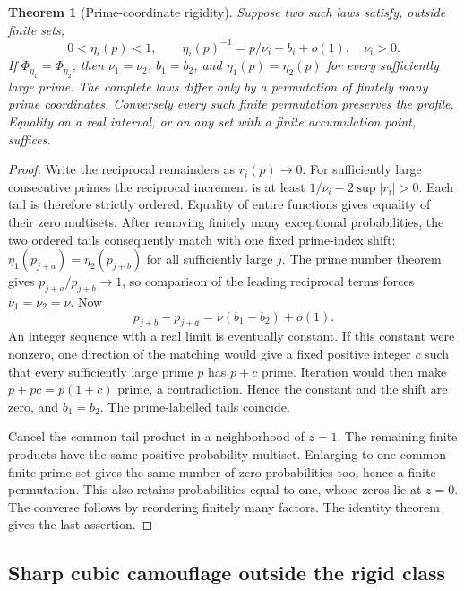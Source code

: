 \documentclass[11pt]{article}
\newtheorem{theorem}{Theorem}[section]
\theoremstyle{definition}
\begin{document}
\begin{theorem}[Prime-coordinate rigidity]
Suppose two such laws satisfy, outside finite sets,
\[
 0<\eta_i(p)<1,\qquad
 \eta_i(p)^{-1}=p/\nu_i+b_i+o(1),\quad \nu_i>0.
\]
If $\Phi_{\eta_1}=\Phi_{\eta_2}$, then $\nu_1=\nu_2$, $b_1=b_2$,
and $\eta_1(p)=\eta_2(p)$ for every sufficiently large prime.
The complete laws differ only by a permutation of finitely many prime
coordinates. Conversely every such finite permutation preserves the profile.
Equality on a real interval, or on any set with a finite accumulation
point, suffices.
\end{theorem}
\begin{proof}
Write the reciprocal remainders as $r_i(p)\to0$.
For sufficiently large consecutive primes the reciprocal increment is at
least $1/\nu_i-2\sup|r_i|>0$. Each tail is therefore strictly ordered.
Equality of entire functions gives equality of their zero multisets.
After removing finitely many exceptional probabilities, the two ordered
tails consequently match with one fixed prime-index shift:
$\eta_1(p_{j+a})=\eta_2(p_{j+b})$ for all sufficiently large $j$.
The prime number theorem gives $p_{j+a}/p_{j+b}\to1$, so comparison of
the leading reciprocal terms forces $\nu_1=\nu_2=\nu$.
Now
\[
 p_{j+b}-p_{j+a}=\nu(b_1-b_2)+o(1).
\]
An integer sequence with a real limit is eventually constant.
If this constant were nonzero, one direction of the matching would give
a fixed positive integer $c$ such that every sufficiently large prime
$p$ has $p+c$ prime. Iteration would then make $p+pc=p(1+c)$ prime,
a contradiction. Hence the constant and the shift are zero, and
$b_1=b_2$. The prime-labelled tails coincide.

Cancel the common tail product in a neighborhood of $z=1$.
The remaining finite products have the same positive-probability
multiset. Enlarging to one common finite prime set gives the same number
of zero probabilities too, hence a finite permutation.
This also retains probabilities equal to one, whose zeros lie at $z=0$.
The converse follows by reordering finitely many factors. The identity
theorem gives the last assertion.
\end{proof}

\subsection{Sharp cubic camouflage outside the rigid class}
\end{document}
